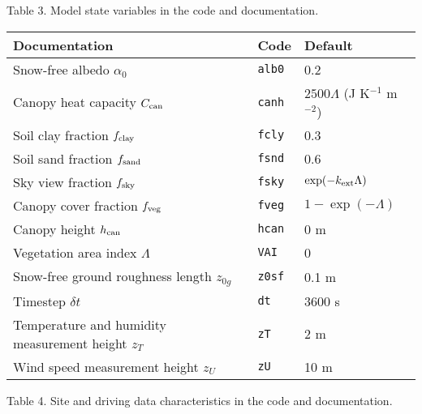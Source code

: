 \documentclass{article}
\begin{document}
Table 3. Model state variables in the code and documentation.

\vskip20pt
\begin{tabular}{|l|l|l|}
\hline
Documentation & Code & Default \\
\hline
Snow-free albedo $\alpha_0$ & {\tt alb0} & 0.2 \\
Canopy heat capacity $C_{\rm can}$ & {\tt canh} & $2500\Lambda$ (J K$^{-1}$ m$^{-2}$) \\
Soil clay fraction $f_{\rm clay}$ & {\tt fcly} & 0.3 \\
Soil sand fraction $f_{\rm sand}$ & {\tt fsnd} & 0.6 \\
Sky view fraction $f_{\rm sky}$ & {\tt fsky} & $\exp(-k_{\rm ext}\Lambda)$ \\
Canopy cover fraction $f_{\rm veg}$ & {\tt fveg} & $1 - \exp(-\Lambda)$ \\
Canopy height $h_{\rm can}$ & {\tt hcan} & 0 m \\
Vegetation area index $\Lambda$ & {\tt VAI} & 0 \\
Snow-free ground roughness length $z_{0g}$ & {\tt z0sf} & 0.1 m \\
Timestep $\delta t$ & {\tt dt} & 3600 s \\
Temperature and humidity measurement height $z_T$ & {\tt zT} & 2 m  \\
Wind speed measurement height $z_U$ & {\tt zU} & 10 m  \\
\hline 
\end{tabular}

Table 4. Site and driving data characteristics in the code and documentation.
\end{document}
